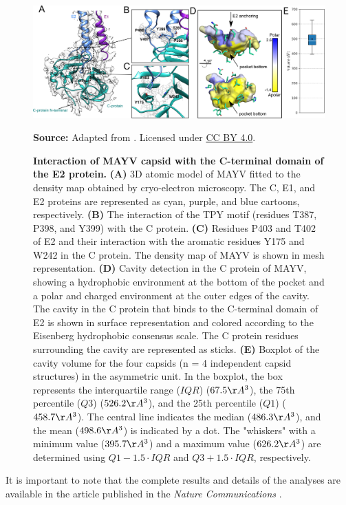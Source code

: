 \documentclass[Ingles]{phdthesis}
\begin{document}
\begin{figure}[hp]
  \centerline{\includegraphics[scale=0.23]{images/mayv-c-e2.png}}
  \centerline{\tiny{\textbf{Source:} Adapted from \cite{ribeiro2021}. Licensed under \href{https://creativecommons.org/licenses/by/4.0/}{CC BY 4.0}.}}
  \caption[Interaction of MAYV capsid with the C-terminal domain of the E2 protein]{\textbf{Interaction of MAYV capsid with the C-terminal domain of the E2 protein.} \textbf{(A)} 3D atomic model of \acs{MAYV} fitted to the density map obtained by cryo-electron microscopy. The C, E1, and E2 proteins are represented as cyan, purple, and blue cartoons, respectively. \textbf{(B)} The interaction of the TPY motif (residues T387, P398, and Y399) with the C protein. \textbf{(C)} Residues P403 and T402 of E2 and their interaction with the aromatic residues Y175 and W242 in the C protein. The density map of \acs{MAYV} is shown in mesh representation. \textbf{(D)} Cavity detection in the C protein of \acs{MAYV}, showing a hydrophobic environment at the bottom of the pocket and a polar and charged environment at the outer edges of the cavity. The cavity in the C protein that binds to the C-terminal domain of E2 is shown in surface representation and colored according to the Eisenberg hydrophobic consensus scale. The C protein residues surrounding the cavity are represented as sticks. \textbf{(E)} Boxplot of the cavity volume for the four capsids (n = 4 independent capsid structures) in the asymmetric unit. In the boxplot, the box represents the interquartile range ($IQR$) ($67.5 \AA^3$), the 75th percentile ($Q3$) ($526.2 \AA^3$), and the 25th percentile ($Q1$) ($458.7 \AA^3$). The central line indicates the median ($486.3 \AA^3$), and the mean ($498.6 \AA^3$) is indicated by a dot. The "whiskers" with a minimum value ($395.7 \AA^3$) and a maximum value ($626.2 \AA^3$) are determined using $Q1-1.5 \cdot IQR$ and $Q3+1.5 \cdot IQR$, respectively.}
  \label{fig:mayv-c-e2}
\end{figure}

It is important to note that the complete results and details of the analyses are available in the article published in the \textit{Nature Communications} \cite{ribeiro2021}.
\end{document}
